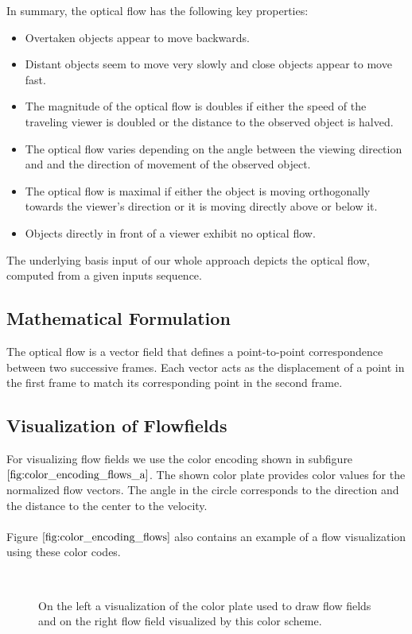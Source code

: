 In summary, the optical flow has the following key properties:
\begin{itemize}
  \item Overtaken objects appear to move backwards.
  \item Distant objects seem to move very slowly and close objects appear to move fast.
  \item The magnitude of the optical flow is doubles if either the speed of the traveling viewer is doubled or the distance to the observed object is halved.
  \item The optical flow varies depending on the angle between the viewing direction and and the direction of movement of the observed object.
  \item The optical flow is maximal if either the object is moving orthogonally towards the viewer's direction or it is moving directly above or below it.
  \item Objects directly in front of a viewer exhibit no optical flow.
\end{itemize}

The underlying basis input of our whole approach depicts the optical flow, computed from a given inputs sequence.

\subsection{Mathematical Formulation}


The optical flow is a vector field that defines a point-to-point correspondence between two successive frames. Each vector acts as the displacement of a point in the first frame to match its corresponding point in the second frame.
\subsection{Visualization of Flowfields}

For visualizing flow fields we use the color encoding shown in subfigure $\ref{fig:color_encoding_flows_a}$. The shown color plate provides color values for the normalized flow vectors. The angle in the circle corresponds to the direction and the distance to the center to the velocity. \\ \\
Figure $\ref{fig:color_encoding_flows}$ also contains an example of a flow visualization using these color codes.
\begin{figure}[H]
\begin{center}
~
\end{center}
\caption[Visual Color Encoding of Flow Fields]{On the left a visualization of the color plate used to draw flow fields and on the right flow field visualized by this color scheme.}
\label{fig:color_encoding_flows}
\end{figure}

